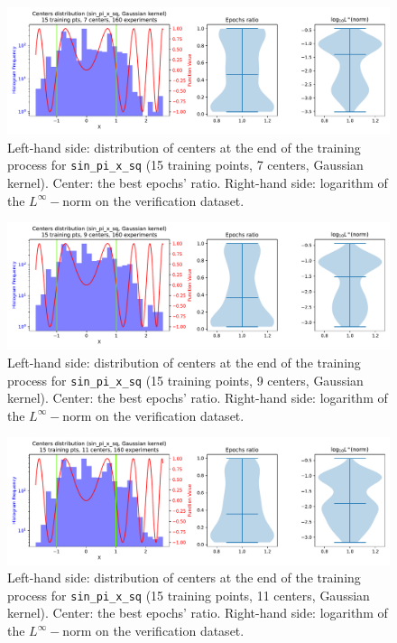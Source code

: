\documentclass[12pt]{report} %
\begin{document}
\begin{figure}[ht]
  \centering
  \includegraphics[width=\textwidth]
  {imagenes/experiments/1d/sin_pi_x_sq_statistic_interpolation/tr15_c7_sin_pi_x_sq_gaussian_kernel.pdf}
  \caption{Left-hand side: distribution of centers at the end of the training process for
    \texttt{sin\_pi\_x\_sq} (15 training points, 7 centers, Gaussian kernel). Center: the best epochs' ratio.
    Right-hand side: logarithm of the $L^\infty-$norm on the verification dataset.}
  \label{fig:sin-pi-x-sq-statistic-tr15-c7}
\end{figure}

\begin{figure}[ht]
  \centering
  \includegraphics[width=\textwidth]
  {imagenes/experiments/1d/sin_pi_x_sq_statistic_interpolation/tr15_c9_sin_pi_x_sq_gaussian_kernel.pdf}
  \caption{Left-hand side: distribution of centers at the end of the training process for
    \texttt{sin\_pi\_x\_sq} (15 training points, 9 centers, Gaussian kernel). Center: the best epochs' ratio.
    Right-hand side: logarithm of the $L^\infty-$norm on the verification dataset.}
  \label{fig:sin-pi-x-sq-statistic-tr15-c9}
\end{figure}

\begin{figure}[ht]
  \centering
  \includegraphics[width=\textwidth]
  {imagenes/experiments/1d/sin_pi_x_sq_statistic_interpolation/tr15_c11_sin_pi_x_sq_gaussian_kernel.pdf}
  \caption{Left-hand side: distribution of centers at the end of the training process for
    \texttt{sin\_pi\_x\_sq} (15 training points, 11 centers, Gaussian kernel). Center: the best epochs' ratio.
    Right-hand side: logarithm of the $L^\infty-$norm on the verification dataset.}
  \label{fig:sin-pi-x-sq-statistic-tr15-c11}
\end{figure}
\end{document}
